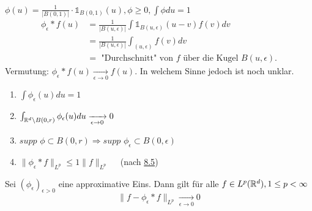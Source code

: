 \begin{beispiel*}
	$\phi(u) = \frac{1}{|B(0, 1)|} \cdot \mathds{1}_{B(0, 1)}(u), \phi \geq 0, \int \phi du = 1	$ \\
	\begin{align*}
		\phi_{\epsilon} \ast f(u) & = \frac{1}{|B(u, \epsilon)|} \int \mathds{1}_{B(u, \epsilon)}(u - v) f(v) dv \\
		&  = \frac{1}{|B(u, \epsilon)|} \int_{(u, \epsilon)} f(v) dv \\
		& = \text{ "Durchschnitt" von } f \text{ über die Kugel } B(u, \epsilon). 
	\end{align*}
	Vermutung: $\phi_{\epsilon} \ast f(u) \xrightarrow[\epsilon \rightarrow 0]{} f(u)$. In welchem Sinne jedoch ist noch unklar.
\end{beispiel*}

\begin{bemerkung} \label{bem:8.7}
	\begin{enumerate}[label=\roman*\upshape)]
		\label{bem:8.7i}
		\item $\int \phi_{\epsilon}(u) du = 1$
		\label{bem:8.7ii}
		\item $\int_{\mathbb{R}^{d} \setminus B(0, r)} \phi_{\epsilon}(u) du \xrightarrow[\epsilon \rightarrow 0]{} 0$
		\label{bem:8.7iii}
		\item $supp$ $\phi \subset B(0, r) \Rightarrow supp$ $\phi_{\epsilon} \subset B(0, \epsilon)$
		\label{bem:8.7iv}
		\item $\| \phi_{\epsilon} \ast f \|_{L^{p}} \leq 1 \| f \|_{L^{p}} \quad$ (nach \hyperref[satz:8.5-young]{8.5})
	\end{enumerate}
\end{bemerkung}

\begin{satz}\label{satz:8.8}
	Sei $(\phi_{\epsilon})_{\epsilon > 0}$ eine approximative Eins. Dann gilt für alle $f \in L^{p}(\mathbb{R}^{d}), 1 \leq p < \infty$
		\[ \| f - \phi_{\epsilon} \ast f \|_{L^{p}} \xrightarrow[\epsilon \rightarrow 0]{} 0 \]
\end{satz}

